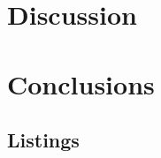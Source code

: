 \documentclass{article}
\begin{document}
  \section{Discussion}
  \section{Conclusions}

  \newpage
  
  

  \newpage
  \begin{appendix}
    \listoffigures
    \listoftables
    \section*{Listings}
  \end{appendix}
  
\end{document}
